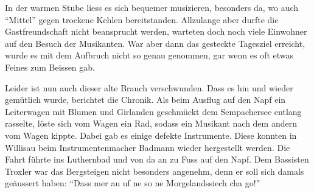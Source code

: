 \begin{multicols}{2}
    In der warmen Stube liess es sich bequemer musizieren, besonders da,
    wo auch "`Mittel"' gegen trockene Kehlen bereitstanden.
    Allzulange aber durfte die Gastfreundschaft nicht beansprucht werden,
    warteten doch noch viele Einwohner auf den Besuch der Musikanten.
    War aber dann das gesteckte Tagesziel erreicht, wurde
    es mit dem Aufbruch nicht so genau genommen, gar
    wenn es oft etwas Feines zum Beissen gab.

    Leider ist nun auch dieser alte Brauch verschwunden.
    Dass es hin und wieder gemütlich wurde, berichtet
    die Chronik. Als beim Ausflug auf den Napf ein
    Leiterwagen mit Blumen und Girlanden geschmückt
    dem Sempachersee entlang rasselte, löste sich vom
    Wagen ein Rad, sodass ein Musikant nach dem andern
    vom Wagen kippte. Dabei gab es einige defekte
    Instrumente. Diese konnten in Willisau beim Instrumentenmacher Badmann wieder hergestellt werden.
    Die Fahrt führte ins Luthernbad und von da an zu
    Fuss auf den Napf. Dem Bassisten Troxler war das
    Bergsteigen nicht besonders angenehm, denn er soll sich
    damals geäussert haben: "`Dass mer au uf ne so ne Morgelandssiech cha go!"'



\end{multicols}
